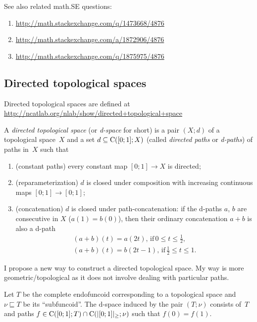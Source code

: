 See also related math.SE questions:
\begin{enumerate}
\item \url{http://math.stackexchange.com/q/1473668/4876}
\item \url{http://math.stackexchange.com/a/1872906/4876}
\item \url{http://math.stackexchange.com/q/1875975/4876}
\end{enumerate}

\subsection{Directed topological spaces}

Directed topological spaces are defined at\\
\url{http://ncatlab.org/nlab/show/directed+topological+space}

\begin{defn}
A \emph{directed topological space} (or \emph{d-space} for short) is a pair $(X;d)$ of a topological space~$X$ and
a set $d\subseteq\mathrm{C}([0;1];X)$ (called \emph{directed paths} or \emph{d-paths}) of paths in~$X$ such that
\begin{enumerate}
\item (constant paths) every constant map $[0;1]\to X$ is directed;
\item (reparameterization) $d$ is closed under composition with increasing continuous maps $[0;1]\to [0;1]$;
\item (concatenation) $d$ is closed under path-concatenation: if the d-paths $a$, $b$ are consecutive in $X$ ($a(1)=b(0)$), then their ordinary concatenation $a+b$ is also a d-path
\begin{gather*}
(a+b)(t) = a(2t),\,\text{if}\, 0\le t\le \frac{1}{2}, \\
(a+b)(t) = b(2t-1),\,\text{if}\, \frac{1}{2}\le t\le 1.
\end{gather*}
\end{enumerate}
\end{defn}

I propose a new way to construct a directed topological space. My way is more geometric/topological as it does not involve dealing with particular paths.

\begin{defn}
Let $ T$ be the complete endofuncoid corresponding to a topological space
and $\nu\sqsubseteq T$ be its ``subfuncoid''. The $\mathrm{d}$-space induced by the pair $( T;\nu)$
consists of~$ T$ and paths $f\in\mathrm{C}([0;1]; T) \cap \mathrm{C}(|[0;1]|_{\geq}; \nu)$
such that $f(0)=f(1)$.
\end{defn}

